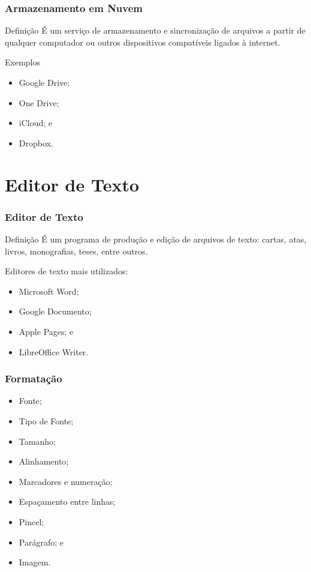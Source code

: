 \documentclass[aspectratio=169]{beamer} %
\begin{document}
\begin{frame}
	\frametitle{Armazenamento em Nuvem}

	\begin{block}{Defini\c cão}
		É um serviço de armazenamento e sincronização de arquivos a partir de qualquer computador ou outros dispositivos compatíveis ligados à internet.
	\end{block} \vfill

	\begin{exampleblock}{Exemplos}
		\begin{itemize}
			\item Google Drive;
			\item One Drive;
			\item iCloud; e
			\item Dropbox.
		\end{itemize}
	\end{exampleblock}
\end{frame}


\section{Editor de Texto}

\begin{frame}
	\frametitle{Editor de Texto}
	
	\begin{block}{Defini\c cão}
		É um programa de produ\c cão e edição de arquivos de texto: cartas, atas,  livros, monografias, teses,  entre outros.
	\end{block} \vfill
		
	Editores de texto mais utilizados:
	\begin{itemize}
		\item Microsoft Word;
		\item Google Documento;
		\item Apple Pages; e
		\item LibreOffice Writer.
	\end{itemize}
\end{frame}

\begin{frame}
	\frametitle{Formata\c cão}
			
	\begin{itemize}
		\item Fonte;
		\item Tipo de Fonte; 
		\item Tamanho; 
		\item Alinhamento;
		\item Marcadores e numera\c cão;
		\item Espa\c camento entre linhas;
		\item Pincel;
		\item Parágrafo; e
		\item Imagem.
	\end{itemize}
\end{frame}
\end{document}
